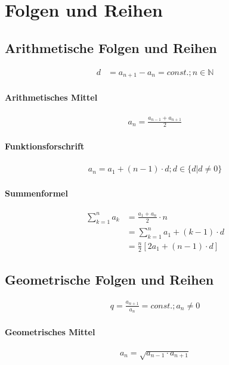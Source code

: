 \section{Folgen und Reihen}
\subsection{Arithmetische Folgen und Reihen}

\begin{align*}
d &=a_{n+1} - a_n = const. ; n \in \mathbb{N}
\end{align*}

\paragraph{Arithmetisches Mittel}
\begin{align*}
    a_n=\frac{a_{n-1}+a_{n+1}}{2}
\end{align*}

\paragraph{Funktionsforschrift}
\begin{align*}
    a_n = a_1+(n-1) \cdot d ; d \in \{d|d \neq 0\}
\end{align*}

\paragraph{Summenformel}
\begin{align*}
    \sum_{k=1}^{n} a_k &= \frac{a_1+a_n}{2} \cdot n \\
    &= \sum_{k=1}^{n} a_1 +(k-1) \cdot d \\
    &= \frac{n}{2}[2a_1+(n-1) \cdot d]
\end{align*}



\subsection{Geometrische Folgen und Reihen}
\begin{align*}
    q = \frac{a_{n+1}}{a_n} = const. ; a_n \neq 0
\end{align*}

\paragraph{Geometrisches Mittel}
\begin{align*}
    a_n= \sqrt{a_{n-1} \cdot a_{n+1}}
\end{align*}

